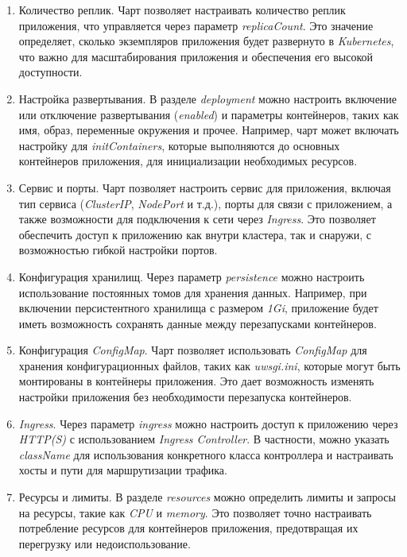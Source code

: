 \begin{enumerate}
    \item Количество реплик. Чарт позволяет настраивать количество реплик приложения, что управляется через параметр \textit{replicaCount}. Это значение определяет, сколько экземпляров приложения будет развернуто в \textit{Kubernetes}, что важно для масштабирования приложения и обеспечения его высокой доступности.

    \item Настройка развертывания. В разделе \textit{deployment} можно настроить включение или отключение развертывания (\textit{enabled}) и параметры контейнеров, таких как имя, образ, переменные окружения и прочее. Например, чарт может включать настройку для \textit{initContainers}, которые выполняются до основных контейнеров приложения, для инициализации необходимых ресурсов.

    \item Сервис и порты. Чарт позволяет настроить сервис для приложения, включая тип сервиса (\textit{ClusterIP}, \textit{NodePort} и т.д.), порты для связи с приложением, а также возможности для подключения к сети через \textit{Ingress}. Это позволяет обеспечить доступ к приложению как внутри кластера, так и снаружи, с возможностью гибкой настройки портов.

    \item Конфигурация хранилищ. Через параметр \textit{persistence} можно настроить использование постоянных томов для хранения данных. Например, при включении персистентного хранилища с размером \textit{1Gi}, приложение будет иметь возможность сохранять данные между перезапусками контейнеров.

    \item Конфигурация \textit{ConfigMap}. Чарт позволяет использовать \textit{ConfigMap} для хранения конфигурационных файлов, таких как \textit{uwsgi.ini}, которые могут быть монтированы в контейнеры приложения. Это дает возможность изменять настройки приложения без необходимости перезапуска контейнеров.

    \item \textit{Ingress}. Через параметр \textit{ingress} можно настроить доступ к приложению через \textit{HTTP(S)} с использованием \textit{Ingress Controller}. В частности, можно указать \textit{className} для использования конкретного класса контроллера и настраивать хосты и пути для маршрутизации трафика.

    \item Ресурсы и лимиты. В разделе \textit{resources} можно определить лимиты и запросы на ресурсы, такие как \textit{CPU} и \textit{memory}. Это позволяет точно настраивать потребление ресурсов для контейнеров приложения, предотвращая их перегрузку или недоиспользование.


\end{enumerate}
